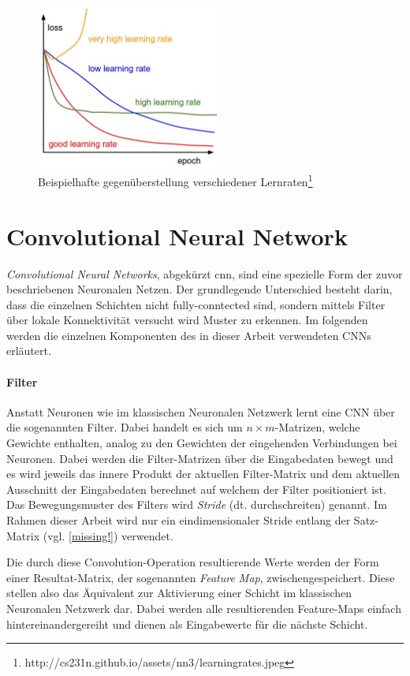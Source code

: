 \begin{figure}[h]
  \centering
  \includegraphics[width=6cm]{img/learning_rates_comparison}
  \caption{Beispielhafte gegenüberstellung verschiedener Lernraten\protect\footnote{http://cs231n.github.io/assets/nn3/learningrates.jpeg}}
  \label{fig:learn_rates}
\end{figure}

\section{Convolutional Neural Network}
\emph{Convolutional Neural Networks}, abgekürzt \gls{cnn}, sind eine spezielle Form der zuvor beschriebenen Neuronalen Netzen. Der grundlegende Unterschied besteht darin, dass die einzelnen Schichten nicht fully-conntected sind, sondern mittels Filter über lokale Konnektivität versucht wird Muster zu erkennen. Im folgenden werden die einzelnen Komponenten des in dieser Arbeit verwendeten CNNs erläutert.

\paragraph{Filter}\label{basic:cnn:filter} Anstatt Neuronen wie im klassischen Neuronalen Netzwerk lernt eine CNN über die sogenannten Filter. Dabei handelt es sich um $n\times m$-Matrizen, welche Gewichte enthalten, analog zu den Gewichten der eingehenden Verbindungen bei Neuronen. Dabei werden die Filter-Matrizen über die Eingabedaten bewegt und es wird jeweils das innere Produkt der aktuellen Filter-Matrix und dem aktuellen Ausschnitt der Eingabedaten berechnet auf welchem der Filter positioniert ist. Das Bewegungsmuster des Filters wird \emph{Stride} (dt. durchschreiten) genannt. Im Rahmen dieser Arbeit wird nur ein eindimensionaler Stride entlang der Satz-Matrix (vgl. \ref{missing!}) verwendet.

Die durch diese Convolution-Operation resultierende Werte werden der Form einer Resultat-Matrix, der sogenannten \emph{Feature Map}, zwischengespeichert. Diese stellen also das Äquivalent zur Aktivierung einer Schicht im klassischen Neuronalen Netzwerk dar. Dabei werden alle resultierenden Feature-Maps einfach hintereinandergereiht und dienen als Eingabewerte für die nächste Schicht. 

